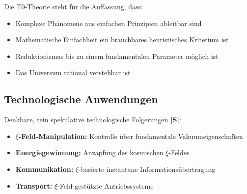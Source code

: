 	Die T0-Theorie steht für die Auffassung, dass:
	
	\begin{itemize}
		\item Komplexe Phänomene aus einfachen Prinzipien ableitbar sind
		\item Mathematische Einfachheit ein brauchbares heuristisches Kriterium ist
		\item Reduktionismus bis zu einem fundamentalen Parameter möglich ist
		\item Das Universum rational verstehbar ist
	\end{itemize}

	\subsection{Technologische Anwendungen}
	
	Denkbare, rein spekulative technologische Folgerungen \textbf{[S]}:
	
	\begin{itemize}
		\item \textbf{$\xi$-Feld-Manipulation:} Kontrolle über fundamentale Vakuumeigenschaften
		\item \textbf{Energiegewinnung:} Anzapfung des kosmischen $\xi$-Feldes
		\item \textbf{Kommunikation:} $\xi$-basierte instantane Informationsübertragung
		\item \textbf{Transport:} $\xi$-Feld-gestützte Antriebssysteme
	\end{itemize}

